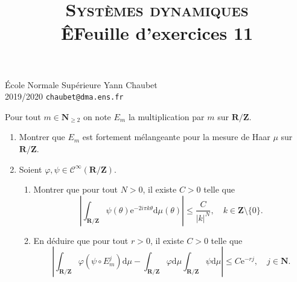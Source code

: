 \documentclass[a4paper,10pt,openany]{article}
\title{\textsc{Syst\`emes dynamiques} \\\^EFeuille d'exercices 11}
\date{}
\author{}
\theoremstyle{plain}
\theoremstyle{definition}
\newcommand{\e}{\mathrm{e}}
\newcommand{\dd}{\mathrm{d}}
\newcommand{\R}{\mathbf{R}}
\newcommand{\Z}{\mathbf{Z}}
\newcommand{\N}{\mathbf{N}}
\begin{document}
{\noindent \'Ecole Normale Sup\'erieure  \hfill Yann Chaubet } \\
{2019/2020 \hfill \texttt{chaubet@dma.ens.fr}}

{\let\newpage\relax\maketitle}
\maketitle

\iffalse
\noindent {\large \textbf{Exercice 1.} \textit{M\'elange des d\'ecalages de Bernouilli}} \vspace{1.5mm} 

\noindent Soit $\Sigma_\ell = \{1, \dots, \ell\}$ o\`u $\ell \in \N_{\geq 1}$ et $\sigma$ le d\'ecalage sur $X = (\Sigma_\ell)^\Z$. On se donne $p_1, \dots, p_\ell \in [0,1]$ tels que $p_1 + \dots + p_\ell = 1$ et on consid\`ere l'unique probabilit\'e $\mu$ sur $(X, \mathcal{P}(\Sigma_\ell)^{\otimes \Z})$ telle que 
$$
\mu \Bigl(\bigl\{x = (x_n)_{n \in \Z} \in X,~x_j = k_j,~|j| \leq N \bigr\} \Bigr) = \prod_{j=-n}^n p_{k_j}, \quad N \in \N, \quad k_j \in \Sigma_\ell.
$$
Montrer que $\sigma$ est m\'elangeante sur $(X,\mu)$.


\vspace{0.6cm}
\fi


 \vspace{1.5mm} 

\noindent Pour tout $m \in \N_{\geq 2}$ on note $E_m$ la multiplication par $m$ sur $\R/\Z$. 

\begin{enumerate}
\item Montrer que $E_m$ est fortement m\'elangeante pour la mesure de Haar $\mu$ sur $\R/\Z$.
\item Soient $\varphi, \psi \in \mathcal{C}^{\infty}(\R/\Z)$. 
\begin{enumerate}
\item Montrer que pour tout $N > 0$, il existe $C > 0$ telle que
$$
\left| \int_{\R/\Z} \psi(\theta) \e^{-2i\pi k \theta} \dd \mu (\theta)\right| \leq \frac{C}{|k|^{N}}, \quad k \in \Z \setminus \{0\}.
$$
\item En d\'eduire que pour tout $r> 0$, il existe $C > 0$ telle que 
$$
\left|\int_{\R/\Z} \varphi \left(\psi \circ E_m^j\right) \dd \mu - \int_{\R/\Z} \varphi \dd \mu \int_{\R/\Z} \psi \dd \mu \right| \leq C \e^{-rj}, \quad j \in \N.
$$
\end{enumerate}
\end{enumerate}
\end{document}
